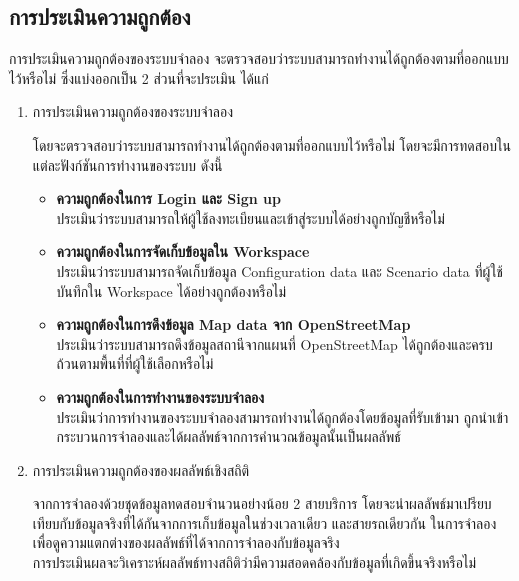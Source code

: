 \subsection{การประเมินความถูกต้อง}
\begin{mypara}
    \indent การประเมินความถูกต้องของระบบจำลอง จะตรวจสอบว่าระบบสามารถทำงานได้ถูกต้องตามที่ออกแบบไว้หรือไม่
    ซึ่งแบ่งออกเป็น 2 ส่วนที่จะประเมิน ได้แก่
\end{mypara}
    \begin{enumerate}
        \item การประเมินความถูกต้องของระบบจำลอง
            \begin{mypara}
                \indent โดยจะตรวจสอบว่าระบบสามารถทำงานได้ถูกต้องตามที่ออกแบบไว้หรือไม่ โดยจะมีการทดสอบในแต่ละฟังก์ชันการทำงานของระบบ
                ดังนี้
            \end{mypara}
                \begin{itemize}
                    \item \textbf{ความถูกต้องในการ Login และ Sign up}
                        \\ ประเมินว่าระบบสามารถให้ผู้ใช้ลงทะเบียนและเข้าสู่ระบบได้อย่างถูกบัญชีหรือไม่
                    \item \textbf{ความถูกต้องในการจัดเก็บข้อมูลใน Workspace}
                        \\ ประเมินว่าระบบสามารถจัดเก็บข้อมูล Configuration data และ Scenario data ที่ผู้ใช้บันทึกใน Workspace ได้อย่างถูกต้องหรือไม่ 
                    \item \textbf{ความถูกต้องในการดึงข้อมูล Map data จาก OpenStreetMap}
                        \\ ประเมินว่าระบบสามารถดึงข้อมูลสถานีจากแผนที่ OpenStreetMap ได้ถูกต้องและครบถ้วนตามพื้นที่ที่ผู้ใช้เลือกหรือไม่
                    \item \textbf{ความถูกต้องในการทำงานของระบบจำลอง}
                        \\ ประเมินว่าการทำงานของระบบจำลองสามารถทำงานได้ถูกต้องโดยข้อมูลที่รับเข้ามา
                        ถูกนำเข้ากระบวนการจำลองและได้ผลลัพธ์จากการคำนวณข้อมูลนั้นเป็นผลลัพธ์
                \end{itemize}
        \item การประเมินความถูกต้องของผลลัพธ์เชิงสถิติ
            \begin{mypara}
                \indent จากการจำลองด้วยชุดข้อมูลทดสอบจำนวนอย่างน้อย 2 สายบริการ 
                โดยจะนำผลลัพธ์มาเปรียบเทียบกับข้อมูลจริงที่ได้กันจากการเก็บข้อมูลในช่วงเวลาเดียว
                และสายรถเดียวกัน ในการจำลองเพื่อดูความแตกต่างของผลลัพธ์ที่ได้จากการจำลองกับข้อมูลจริง \\
                \indent การประเมินผลจะวิเคราะห์ผลลัพธ์ทางสถิติว่ามีความสอดคล้องกับข้อมูลที่เกิดขึ้นจริงหรือไม่
            \end{mypara}
        \
    \end{enumerate}
